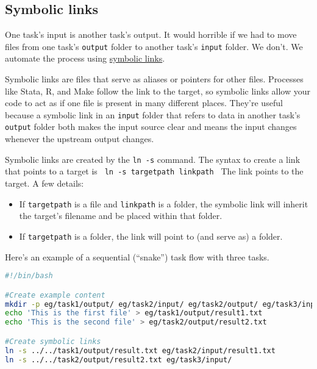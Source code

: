 \subsection{Symbolic links}

One task's input is another task's output.
It would horrible if we had to move files from one task's \texttt{output} folder to another task's \texttt{input} folder.
We don't.
We automate the process using \href{https://en.wikipedia.org/wiki/Symbolic_link\#POSIX_and_Unix-like_operating_systems}{symbolic links}.

Symbolic links are files that serve as aliases or pointers for other files.
Processes like Stata, R, and Make follow the link to the target,
so symbolic links allow your code to act as if one file is present in many different places.
They're useful because a symbolic link in an \texttt{input} folder that refers to data in another task's \texttt{output} folder 
both makes the input source clear and means the input changes whenever the upstream output changes.

Symbolic links are created by the \texttt{ln -s} command.
The syntax to create a link that points to a target is
\texttt{
ln -s targetpath linkpath
}
The link points to the target. A few details:
\begin{itemize}
	\item If \texttt{targetpath} is a file and \texttt{linkpath} is a folder, the symbolic link will inherit the target's filename and be placed within that folder.
	\item If \texttt{targetpath} is a folder, the link will point to (and serve as) a folder.
\end{itemize}

Here's an example of a sequential (``snake'') task flow with three tasks.
\begin{lstlisting}[language=bash]
#!/bin/bash

#Create example content
mkdir -p eg/task1/output/ eg/task2/input/ eg/task2/output/ eg/task3/input/
echo 'This is the first file' > eg/task1/output/result1.txt
echo 'This is the second file' > eg/task2/output/result2.txt

#Create symbolic links
ln -s ../../task1/output/result.txt eg/task2/input/result1.txt
ln -s ../../task2/output/result2.txt eg/task3/input/

\end{lstlisting}


